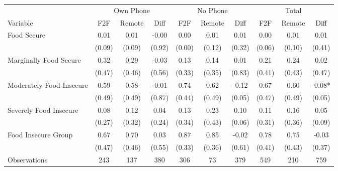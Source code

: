 \begin{tabular}{l*{9}c}
\hline\hline
 & \multicolumn{3}{c}{Own Phone} & \multicolumn{3}{c}{No Phone} & \multicolumn{3}{c}{Total}\\ 
Variable & F2F & Remote & Diff & F2F & Remote & Diff & F2F & Remote & Diff \\
\hline
Food Secure&0.01&0.01&-0.00&0.00&0.01&0.01&0.00&0.01&0.01\\
&(0.09)&(0.09)&(0.92)&(0.00)&(0.12)&(0.32)&(0.06)&(0.10)&(0.41)\\
Marginally Food Secure&0.32&0.29&-0.03&0.13&0.14&0.01&0.21&0.24&0.02\\
&(0.47)&(0.46)&(0.56)&(0.33)&(0.35)&(0.83)&(0.41)&(0.43)&(0.47)\\
Moderately Food Insecure&0.59&0.58&-0.01&0.74&0.62&-0.12&0.67&0.60&-0.08*\\
&(0.49)&(0.49)&(0.87)&(0.44)&(0.49)&(0.05)&(0.47)&(0.49)&(0.05)\\
Severely Food Insecure&0.08&0.12&0.04&0.13&0.23&0.10&0.11&0.16&0.05\\
&(0.27)&(0.32)&(0.24)&(0.34)&(0.43)&(0.06)&(0.31)&(0.36)&(0.09)\\
Food Insecure Group&0.67&0.70&0.03&0.87&0.85&-0.02&0.78&0.75&-0.03\\
&(0.47)&(0.46)&(0.55)&(0.33)&(0.36)&(0.61)&(0.41)&(0.43)&(0.37)\\
\hline
Observations & 243 & 137 & 380 & 306 & 73 & 379 & 549 & 210 & 759 \\
\hline\hline
\end{tabular}
